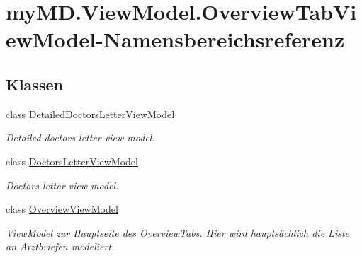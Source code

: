 \hypertarget{namespacemy_m_d_1_1_view_model_1_1_overview_tab_view_model}{}\section{my\+M\+D.\+View\+Model.\+Overview\+Tab\+View\+Model-\/\+Namensbereichsreferenz}
\label{namespacemy_m_d_1_1_view_model_1_1_overview_tab_view_model}
\subsection*{Klassen}
\begin{DoxyCompactItemize}
\item 
class \mbox{\hyperlink{classmy_m_d_1_1_view_model_1_1_overview_tab_view_model_1_1_detailed_doctors_letter_view_model}{Detailed\+Doctors\+Letter\+View\+Model}}
\begin{DoxyCompactList}\small\item\em Detailed doctors letter view model. \end{DoxyCompactList}\item 
class \mbox{\hyperlink{classmy_m_d_1_1_view_model_1_1_overview_tab_view_model_1_1_doctors_letter_view_model}{Doctors\+Letter\+View\+Model}}
\begin{DoxyCompactList}\small\item\em Doctors letter view model. \end{DoxyCompactList}\item 
class \mbox{\hyperlink{classmy_m_d_1_1_view_model_1_1_overview_tab_view_model_1_1_overview_view_model}{Overview\+View\+Model}}
\begin{DoxyCompactList}\small\item\em \mbox{\hyperlink{namespacemy_m_d_1_1_view_model}{View\+Model}} zur Hauptseite des Overview\+Tabs. Hier wird hauptsächlich die Liste an Arztbriefen modeliert. \end{DoxyCompactList}\end{DoxyCompactItemize}
